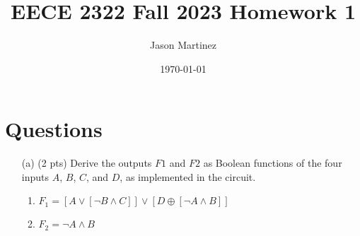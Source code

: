 \documentclass{article}
\title{EECE 2322 Fall 2023 Homework 1}
\author{Jason Martinez}
\date{\today}
\begin{document}
\maketitle

\section*{Questions}

\begin{enumerate}
    \item[(a)] (2 pts) Derive the outputs $F1$ and $F2$ as Boolean functions of the four inputs $A$, $B$, $C$, and $D$, as implemented in the circuit.
        \begin{enumerate}
            \item $F_1 = [A \lor [\neg B \land C]] \lor [D \oplus [\neg A \land B]]$
            \item $F_2 = \neg A \land B$
        \end{enumerate}


\end{enumerate}
\end{document}
